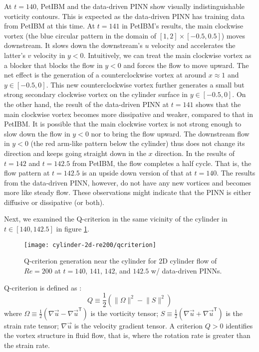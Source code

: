 At $t=140$, PetIBM and the data-driven PINN show visually indistinguishable vorticity contours.
This is expected as the data-driven PINN has training data from PetIBM at this time.
At $t=141$ in PetIBM's results, the main clockwise vortex (the blue circular pattern in the domain of $[1, 2]\times[-0.5, 0.5]$) moves downstream.
It slows down the downstream's $u$ velocity and accelerates the latter's $v$ velocity in $y<0$.
Intuitively, we can treat the main clockwise vortex as a blocker that blocks the flow in $y<0$ and forces the flow to move upward.
The net effect is the generation of a counterclockwise vortex at around $x\approx 1$ and $y \in [-0.5, 0]$.
This new counterclockwise vortex further generates a small but strong secondary clockwise vortex on the cylinder surface in $y\in[-0.5, 0]$.
On the other hand, the result of the data-driven PINN at $t=141$ shows that the main clockwise vortex becomes more dissipative and weaker, compared to that in PetIBM.
It is possible that the main clockwise vortex is not strong enough to slow down the flow in $y<0$ nor to bring the flow upward.
The downstream flow in $y<0$ (the red arm-like pattern below the cylinder) thus does not change its direction and keeps going straight down in the $x$ direction.
In the results of $t=142$ and $t=142.5$ from PetIBM, the flow completes a half cycle.
That is, the flow pattern at $t=142.5$ is an upside down version of that at $t=140$.
The results from the data-driven PINN, however, do not have any new vortices and becomes more like steady flow.
These observations might indicate that the PINN is either diffusive or dissipative (or both).

Next, we examined the Q-criterion in the same vicinity of the cylinder in $t\in[140, 142.5]$ in figure \ref{fig:cylinder-re200-pinn-qcriterion}.
\begin{figure}
    \centering%
    \texttt{[image: cylinder-2d-re200/qcriterion]}%
    \caption{%
        Q-criterion generation near the cylinder for 2D cylinder flow of $Re=\num{200}$ at $t=140$, $141$, $142$, and $142.5$ w/ data-driven PINNs.
    }
    \label{fig:cylinder-re200-pinn-qcriterion}%
\end{figure}
Q-criterion is defined as \cite{jeong_identification_1995}:
\begin{equation}
    Q \equiv \frac{1}{2}\left(\lVert \Omega \rVert^2 - \lVert S \rVert^2\right)
\end{equation}
where $\Omega\equiv\frac{1}{2}\left(\nabla\vec{u}-\nabla\vec{u}^\mathsf{T}\right)$ is the vorticity tensor;
$S\equiv\frac{1}{2}\left(\nabla\vec{u}+\nabla\vec{u}^\mathsf{T}\right)$ is the strain rate tensor;
$\nabla\vec{u}$ is the velocity gradient tensor.
A criterion $Q > 0$ identifies the vortex structure in fluid flow, that is, where the rotation rate is greater than the strain rate.

